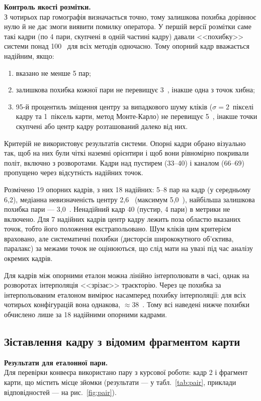 \textbf{Контроль якості розмітки.}\\
З чотирьох пар гомографія визначається точно, тому залишкова похибка дорівнює нулю й не дає змоги виявити помилку оператора. У першій версії розмітки саме такі кадри (по 4 пари, скупчені в одній частині кадру) давали <<похибку>> системи понад 100~\px{} для всіх методів одночасно. Тому опорний кадр вважається надійним, якщо:
\begin{enumerate}
    \item вказано не менше 5 пар;
    \item залишкова похибка кожної пари не перевищує 3~\px{}, інакше одна з точок хибна;
    \item 95-й процентиль зміщення центру за випадкового шуму кліків ($\sigma = 2$~пікселі кадру та 1~піксель карти, метод Монте-Карло) не перевищує 5~\px{}, інакше точки скупчені або центр кадру розташований далеко від них.
\end{enumerate}
Критерій не використовує результатів системи. Опорні кадри обрано візуально так, щоб на них були чіткі наземні орієнтири і щоб вони рівномірно покривали політ, включно з розворотами. Кадри над пустирем (33--40) і каналом (66--69) пропущено через відсутність надійних точок.

Розмічено 19 опорних кадрів, з них 18 надійних: 5--8 пар на кадр (у середньому 6,2), медіанна невизначеність центру 2,6~\px{} (максимум 5,0~\px{}), найбільша залишкова похибка пари --- 3,0~\px{}. Ненадійний кадр 40 (пустир, 4 пари) в метрики не включено. Для 7 надійних кадрів центр кадру лежить поза областю вказаних точок, тобто його положення екстрапольовано. Шум кліків цим критерієм враховано, але систематичні похибки (дисторсія ширококутного об'єктива, паралакс) за межами точок не оцінюються, що слід мати на увазі під час аналізу окремих кадрів.

Для кадрів між опорними еталон можна лінійно інтерполювати в часі, однак на розворотах інтерполяція <<зрізає>> траєкторію. Через це похибка за інтерпольованим еталоном вимірює насамперед похибку інтерполяції: для всіх чотирьох конфігурацій вона однакова, $\approx 38$~\px{}. Тому всі наведені нижче похибки обчислено лише за 18 надійними опорними кадрами.

\subsection{Зіставлення кадру з відомим фрагментом карти}
\label{sec:exp-pair}

\textbf{Результати для еталонної пари.}\\
Для перевірки конвеєра використано пару з курсової роботи: кадр 2 і фрагмент карти, що містить місце зйомки (результати --- у табл.~\ref{tab:pair}, приклади відповідностей --- на рис.~\ref{fig:pair}).

